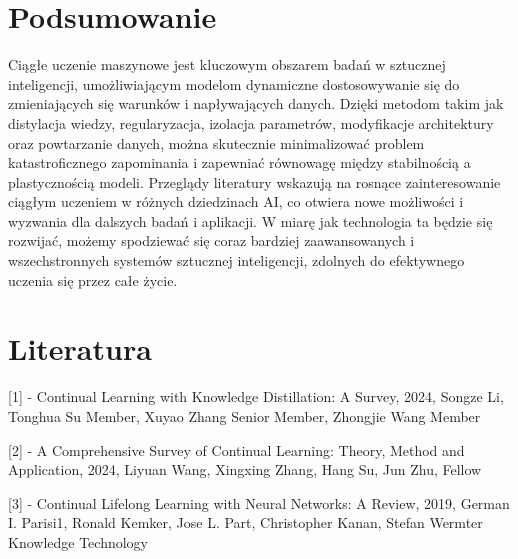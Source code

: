 \documentclass[a4paper,12pt]{article}
\begin{document}
\section{Podsumowanie}

Ciągłe uczenie maszynowe jest kluczowym obszarem badań w sztucznej inteligencji, umożliwiającym modelom dynamiczne dostosowywanie się do zmieniających się warunków i napływających danych. Dzięki metodom takim jak distylacja wiedzy, regularyzacja, izolacja parametrów, modyfikacje architektury oraz powtarzanie danych, można skutecznie minimalizować problem katastroficznego zapominania i zapewniać równowagę między stabilnością a plastycznością modeli. Przeglądy literatury wskazują na rosnące zainteresowanie ciągłym uczeniem w różnych dziedzinach AI, co otwiera nowe możliwości i wyzwania dla dalszych badań i aplikacji. W miarę jak technologia ta będzie się rozwijać, możemy spodziewać się coraz bardziej zaawansowanych i wszechstronnych systemów sztucznej inteligencji, zdolnych do efektywnego uczenia się przez całe życie.


\section{Literatura}
\hspace*{1.5em}[1] - Continual Learning with Knowledge Distillation: A Survey, 2024, Songze Li, Tonghua Su Member, Xuyao Zhang Senior Member, Zhongjie Wang Member

[2] - A Comprehensive Survey of Continual Learning: Theory, Method and Application, 2024, Liyuan Wang, Xingxing Zhang, Hang Su, Jun Zhu, Fellow

[3] - Continual Lifelong Learning with Neural Networks: A Review,  2019, German I. Parisi1, Ronald Kemker, Jose L. Part, Christopher Kanan, Stefan Wermter Knowledge Technology
\end{document}
